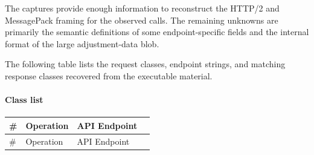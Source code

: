 The captures provide enough information to reconstruct the HTTP/2 and
MessagePack framing for the observed calls.  The remaining unknowns are
primarily the semantic definitions of some endpoint-specific fields and
the internal format of the large adjustment-data blob.

The following table lists the request classes, endpoint strings, and matching
response classes recovered from the executable material.

\newpage

\paragraph{Class list}

\small
\begin{longtable}{p{} p{} p{} p{}}
\toprule
\# & Operation & API Endpoint \\
\midrule
\endfirsthead

\toprule
\# & Operation & API Endpoint \\
\midrule
\endhead


\end{longtable}
